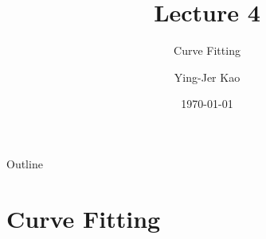 \documentclass{beamer}
\title[Curve Fitting and Root Finding] %
{Lecture 4}
\subtitle
{Curve Fitting} %
\author[Ying-Jer Kao] %
{Ying-Jer Kao}
\institute[National Taiwan University] %
{
  Department of Physics\\
 National Taiwan University
  }
\date[Numerical Analysis and Programming] %
{\today}
\begin{document}
\begin{frame}
  \titlepage
\end{frame}

\begin{frame}{Outline}
  \tableofcontents
\end{frame}



\section[Curve Fitting]{Curve Fitting}
\end{document}
